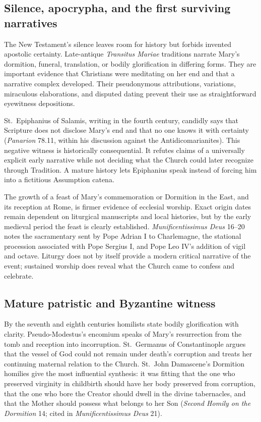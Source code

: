 \subsection{Silence, apocrypha, and the first surviving narratives}

The New Testament's silence leaves room for history but forbids invented apostolic certainty. Late-antique \emph{Transitus Mariae} traditions narrate Mary's dormition, funeral, translation, or bodily glorification in differing forms. They are important evidence that Christians were meditating on her end and that a narrative complex developed. Their pseudonymous attributions, variations, miraculous elaborations, and disputed dating prevent their use as straightforward eyewitness depositions.

St.~Epiphanius of Salamis, writing in the fourth century, candidly says that Scripture does not disclose Mary's end and that no one knows it with certainty (\emph{Panarion} 78.11, within his discussion against the Antidicomarianites). This negative witness is historically consequential. It refutes claims of a universally explicit early narrative while not deciding what the Church could later recognize through Tradition. A mature history lets Epiphanius speak instead of forcing him into a fictitious Assumption catena.

The growth of a feast of Mary's commemoration or Dormition in the East, and its reception at Rome, is firmer evidence of ecclesial worship. Exact origin dates remain dependent on liturgical manuscripts and local histories, but by the early medieval period the feast is clearly established. \emph{Munificentissimus Deus} 16--20 notes the sacramentary sent by Pope Adrian I to Charlemagne, the stational procession associated with Pope Sergius I, and Pope Leo IV's addition of vigil and octave. Liturgy does not by itself provide a modern critical narrative of the event; sustained worship does reveal what the Church came to confess and celebrate.

\subsection{Mature patristic and Byzantine witness}

By the seventh and eighth centuries homilists state bodily glorification with clarity. Pseudo-Modestus's encomium speaks of Mary's resurrection from the tomb and reception into incorruption. St.~Germanus of Constantinople argues that the vessel of God could not remain under death's corruption and treats her continuing maternal relation to the Church. St.~John Damascene's Dormition homilies give the most influential synthesis: it was fitting that the one who preserved virginity in childbirth should have her body preserved from corruption, that the one who bore the Creator should dwell in the divine tabernacles, and that the Mother should possess what belongs to her Son (\emph{Second Homily on the Dormition} 14; cited in \emph{Munificentissimus Deus} 21).

